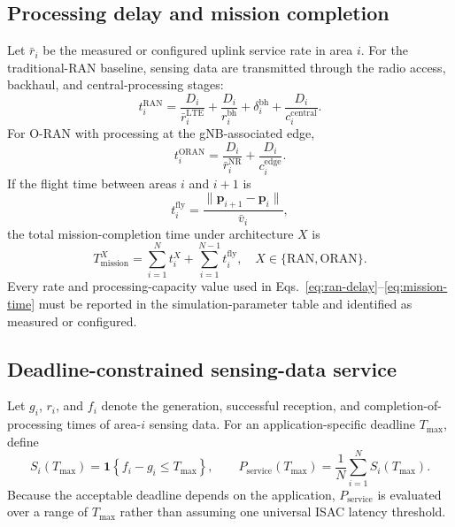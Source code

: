 \subsection{Processing delay and mission completion}

Let $\bar r_i$ be the measured or configured uplink service rate in area $i$.
For the traditional-RAN baseline, sensing data are transmitted through the
radio access, backhaul, and central-processing stages:
\begin{equation}
 t_i^{\mathrm{RAN}} = \frac{D_i}{\bar r_i^{\mathrm{LTE}}}
 +\frac{D_i}{r_i^{\mathrm{bh}}}+\delta_i^{\mathrm{bh}}
 +\frac{D_i}{c_i^{\mathrm{central}}}.
 \label{eq:ran-delay}
\end{equation}
For O-RAN with processing at the gNB-associated edge,
\begin{equation}
 t_i^{\mathrm{ORAN}} = \frac{D_i}{\bar r_i^{\mathrm{NR}}}
 +\frac{D_i}{c_i^{\mathrm{edge}}}.
 \label{eq:oran-delay}
\end{equation}
If the flight time between areas $i$ and $i+1$ is
\begin{equation}
 t_i^{\mathrm{fly}}=\frac{\lVert\mathbf{p}_{i+1}-\mathbf{p}_i\rVert}
 {\bar v_i},
 \label{eq:flight-time}
\end{equation}
the total mission-completion time under architecture $X$ is
\begin{equation}
 T_{\mathrm{mission}}^X = \sum_{i=1}^{N}t_i^X
 +\sum_{i=1}^{N-1}t_i^{\mathrm{fly}},
 \quad X\in\{\mathrm{RAN},\mathrm{ORAN}\}.
 \label{eq:mission-time}
\end{equation}
Every rate and processing-capacity value used in
Eqs.~\eqref{eq:ran-delay}--\eqref{eq:mission-time} must be reported in the
simulation-parameter table and identified as measured or configured.

\subsection{Deadline-constrained sensing-data service}

Let $g_i$, $r_i$, and $f_i$ denote the generation, successful reception, and
completion-of-processing times of area-$i$ sensing data. For an
application-specific deadline $T_{\max}$, define
\begin{equation}
 S_i(T_{\max}) = \mathbf{1}\!\left\{f_i-g_i\leq T_{\max}\right\},
 \qquad
 P_{\mathrm{service}}(T_{\max})=
 \frac{1}{N}\sum_{i=1}^{N}S_i(T_{\max}).
 \label{eq:service-deadline}
\end{equation}
Because the acceptable deadline depends on the application,
$P_{\mathrm{service}}$ is evaluated over a range of $T_{\max}$ rather than
assuming one universal ISAC latency threshold.

